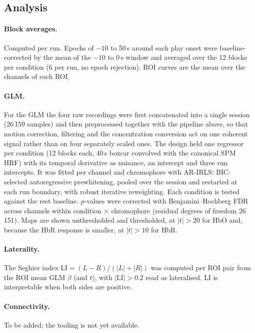 \documentclass[11pt,a4paper]{article}
\begin{document}
\subsection{Analysis}
\paragraph{Block averages.} Computed per run. Epochs of $-10$ to 50\,s around
each play onset were baseline-corrected by the mean of the $-10$ to 0\,s window
and averaged over the 12 blocks per condition (6 per run, no epoch rejection).
ROI curves are the mean over the channels of each ROI.

\paragraph{GLM.} For the GLM the four raw recordings were first concatenated
into a single session (26\,159 samples) and then preprocessed together with the
pipeline above, so that motion correction, filtering and the concentration
conversion act on one coherent signal rather than on four separately scaled
ones. The design held one regressor per condition (12 blocks each, 40\,s boxcar
convolved with the canonical SPM HRF) with its temporal derivative as
nuisance, an intercept and three run intercepts. It was fitted per channel and
chromophore with AR-IRLS: BIC-selected autoregressive prewhitening, pooled over
the session and restarted at each run boundary, with robust iterative
reweighting. Each condition is tested against the rest baseline.
$p$-values were corrected with Benjamini--Hochberg FDR across channels within
condition $\times$ chromophore (residual degrees of freedom 26\,151). Maps are
shown unthresholded and thresholded, at $|t|>20$ for HbO and, because the HbR
response is smaller, at $|t|>10$ for HbR.

\paragraph{Laterality.} The Seghier index $\mathrm{LI} = (L-R)/(|L|+|R|)$ was
computed per ROI pair from the ROI mean GLM $\beta$ (and $t$), with
$|\mathrm{LI}| > 0.2$ read as lateralised. LI is interpretable when both sides
are positive.

\paragraph{Connectivity.} To be added; the tooling is not yet available.
\end{document}
